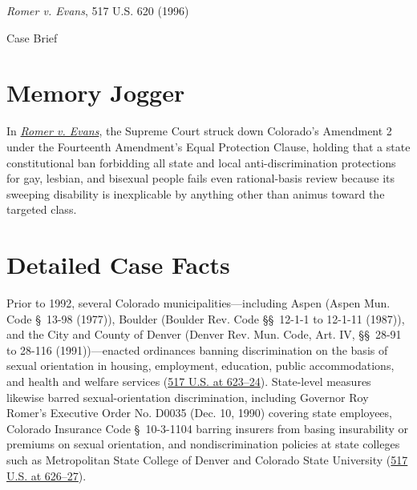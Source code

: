 \documentclass[12pt]{article}
\begin{document}
\begin{center}
{\LARGE \textit{Romer v. Evans}, 517 U.S. 620 (1996)\par}
\vspace{0.8em}
{\large Case Brief\par}
\end{center}
\vspace{1em}

\section{Memory Jogger}

In \href{https://www.courtlistener.com/opinion/118027/romer-v-evans/}{\textit{Romer v. Evans}}, the Supreme Court struck down Colorado's Amendment 2 under the Fourteenth Amendment's Equal Protection Clause, holding that a state constitutional ban forbidding all state and local anti-discrimination protections for gay, lesbian, and bisexual people fails even rational-basis review because its sweeping disability is inexplicable by anything other than animus toward the targeted class.

\section{Detailed Case Facts}

Prior to 1992, several Colorado municipalities---including Aspen (Aspen Mun. Code \S~13-98 (1977)), Boulder (Boulder Rev. Code \S\S~12-1-1 to 12-1-11 (1987)), and the City and County of Denver (Denver Rev. Mun. Code, Art. IV, \S\S~28-91 to 28-116 (1991))---enacted ordinances banning discrimination on the basis of sexual orientation in housing, employment, education, public accommodations, and health and welfare services (\href{https://supreme.justia.com/cases/federal/us/517/620/}{517 U.S. at 623--24}). State-level measures likewise barred sexual-orientation discrimination, including Governor Roy Romer's Executive Order No. D0035 (Dec. 10, 1990) covering state employees, Colorado Insurance Code \S~10-3-1104 barring insurers from basing insurability or premiums on sexual orientation, and nondiscrimination policies at state colleges such as Metropolitan State College of Denver and Colorado State University (\href{https://supreme.justia.com/cases/federal/us/517/620/}{517 U.S. at 626--27}).
\end{document}
